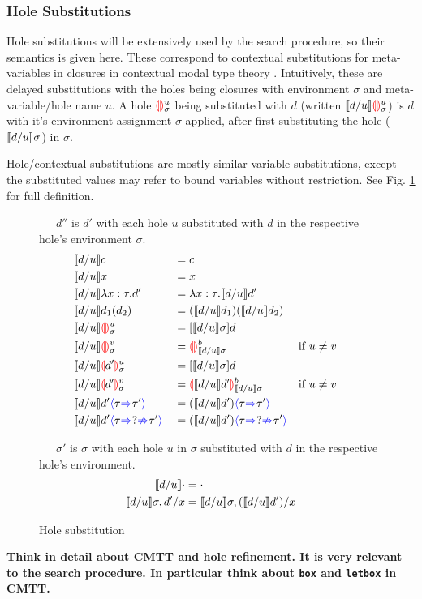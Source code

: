 \subsubsection{Hole Substitutions}
Hole substitutions will be extensively used by the search procedure, so their semantics is given here. These correspond to contextual substitutions for meta-variables in closures in contextual modal type theory \cite{CMTT}. Intuitively, these are delayed substitutions with the holes being closures with environment $\sigma$ and meta-variable/hole name $u$. A hole $\hole^u_\sigma$ being substituted with $d$ (written $\contextualsub \hole_\sigma^u$) is $d$ with it's environment assignment $\sigma$ applied, after first substituting the hole ($\contextualsub \sigma$) in $\sigma$.\par Hole/contextual substitutions are mostly similar variable substitutions, except the substituted values may refer to bound variables without restriction. See Fig. \ref{fig:holesubstitution} for full definition. 
\begin{figure}[H]
\small
{}\ \ \ $d''$ is $d'$ with each hole $u$ substituted with $d$ in the respective hole's environment $\sigma$.
\begin{align*}
&\contextualsub c &&= c\\
&\contextualsub x &&= x\\
&\contextualsub \lambda x:\tau.d' &&= \lambda x:\tau. \contextualsub d'\\
&\contextualsub d_1(d_2) &&= (\contextualsub d_1)(\contextualsub d_2)\\
&\contextualsub \hole^u_\sigma &&= [\contextualsub  \sigma]d\\
&\contextualsub \hole^v_\sigma &&= \hole^b_{\contextualsub \sigma} && \text{if $u \neq v$}\\
&\contextualsub \hole[d']^u_\sigma &&= [\contextualsub  \sigma]d\\
&\contextualsub \hole[d']^v_\sigma &&= \hole[\contextualsub d']^b_{\contextualsub \sigma} && \text{if $u \neq v$}\\
&\contextualsub d'\scast{\tau}{\tau'} &&= (\contextualsub d')\scast{\tau}{\tau'}\\
&\contextualsub d'\scasterror{\tau}{\tau'} &&= (\contextualsub d')\scasterror{\tau}{\tau'}\\
\end{align*}

\ \ \ $\sigma'$ is $\sigma$ with each hole $u$ in $\sigma$ substituted with $d$ in the respective hole's environment.
\begin{align*}
\contextualsub \cdot &= \cdot\\ 
\contextualsub \sigma, d'/x &= \contextualsub \sigma, (\contextualsub d')/x
\end{align*}
\caption{Hole substitution}
\label{fig:holesubstitution}
\end{figure} 
\textbf{Think in detail about CMTT and hole refinement. It is very relevant to the search procedure. In particular think about \texttt{box} and \texttt{letbox} in CMTT.} 

